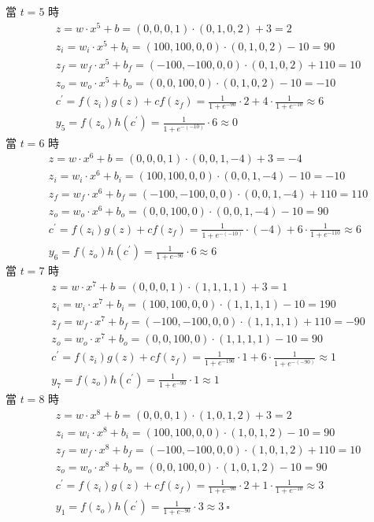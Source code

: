 \documentclass{article}
\begin{document}
當 $t = 5$ 時
\begin{align*}
    &z = w \cdot x^5 + b = (0, 0, 0, 1) \cdot (0, 1, 0, 2) + 3 = 2\\
    &z_i = w_i \cdot x^5 + b_i = (100, 100, 0, 0) \cdot (0, 1, 0, 2) - 10 = 90\\
    &z_f = w_f \cdot x^5 + b_f = (-100, -100, 0, 0) \cdot (0, 1, 0, 2) + 110 = 10\\
    &z_o = w_o \cdot x^5 + b_o = (0, 0, 100, 0) \cdot (0, 1, 0, 2) - 10 = -10\\
    &c^\prime = f(z_i) g(z) + c f(z_f) = \frac{1}{1 + e^{-90}} \cdot 2 + 4 \cdot \frac{1}{1 + e^{-10}} \approx 6\\
    &y_5 = f(z_o) h(c^\prime) = \frac{1}{1 + e^{-(-10)}} \cdot 6 \approx 0
\end{align*}
當 $t = 6$ 時
\begin{align*}
    &z = w \cdot x^6 + b = (0, 0, 0, 1) \cdot (0, 0, 1, -4) + 3 = -4\\
    &z_i = w_i \cdot x^6 + b_i = (100, 100, 0, 0) \cdot (0, 0, 1, -4) - 10 = -10\\
    &z_f = w_f \cdot x^6 + b_f = (-100, -100, 0, 0) \cdot (0, 0, 1, -4) + 110 = 110\\
    &z_o = w_o \cdot x^6 + b_o = (0, 0, 100, 0) \cdot (0, 0, 1, -4) - 10 = 90\\
    &c^\prime = f(z_i) g(z) + c f(z_f) = \frac{1}{1 + e^{-(-10)}} \cdot (-4) + 6 \cdot \frac{1}{1 + e^{-110}} \approx 6\\
    &y_6 = f(z_o) h(c^\prime) = \frac{1}{1 + e^{-90}} \cdot 6 \approx 6
\end{align*}
當 $t = 7$ 時
\begin{align*}
    &z = w \cdot x^7 + b = (0, 0, 0, 1) \cdot (1, 1, 1, 1) + 3 = 1\\
    &z_i = w_i \cdot x^7 + b_i = (100, 100, 0, 0) \cdot (1, 1, 1, 1) - 10 = 190\\
    &z_f = w_f \cdot x^7 + b_f = (-100, -100, 0, 0) \cdot (1, 1, 1, 1) + 110 = -90\\
    &z_o = w_o \cdot x^7 + b_o = (0, 0, 100, 0) \cdot (1, 1, 1, 1) - 10 = 90\\
    &c^\prime = f(z_i) g(z) + c f(z_f) = \frac{1}{1 + e^{-190}} \cdot 1 + 6 \cdot \frac{1}{1 + e^{-(-90)}} \approx 1\\
    &y_7 = f(z_o) h(c^\prime) = \frac{1}{1 + e^{-90}} \cdot 1 \approx 1
\end{align*}
當 $t = 8$ 時
\begin{align*}
    &z = w \cdot x^8 + b = (0, 0, 0, 1) \cdot (1, 0, 1, 2) + 3 = 2\\
    &z_i = w_i \cdot x^8 + b_i = (100, 100, 0, 0) \cdot (1, 0, 1, 2) - 10 = 90\\
    &z_f = w_f \cdot x^8 + b_f = (-100, -100, 0, 0) \cdot (1, 0, 1, 2) + 110 = 10\\
    &z_o = w_o \cdot x^8 + b_o = (0, 0, 100, 0) \cdot (1, 0, 1, 2) - 10 = 90\\
    &c^\prime = f(z_i) g(z) + c f(z_f) = \frac{1}{1 + e^{-90}} \cdot 2 + 1 \cdot \frac{1}{1 + e^{-10}} \approx 3\\
    &y_1 = f(z_o) h(c^\prime) = \frac{1}{1 + e^{-90}} \cdot 3 \approx 3\ \square
\end{align*}
\end{document}
